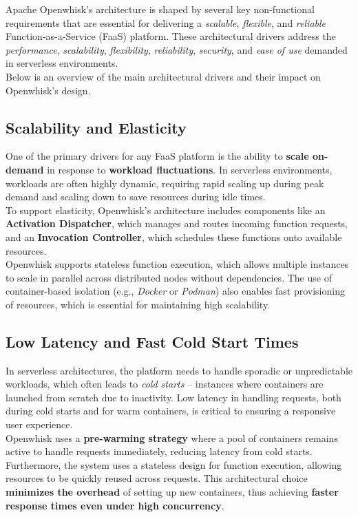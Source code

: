 Apache Openwhisk’s architecture is shaped by several key non-functional requirements that are essential for delivering a \textit{scalable}, \textit{flexible}, and \textit{reliable} Function-as-a-Service (FaaS) platform. These architectural drivers address the \textit{performance}, \textit{scalability}, \textit{flexibility}, \textit{reliability}, \textit{security}, and \textit{ease of use} demanded in serverless environments.\\
Below is an overview of the main architectural drivers and their impact on Openwhisk’s design.
\subsection{Scalability and Elasticity}
One of the primary drivers for any FaaS platform is the ability to \textbf{scale on-demand} in response to \textbf{workload fluctuations}. In serverless environments, workloads are often highly dynamic, requiring rapid scaling up during peak demand and scaling down to save resources during idle times.\vspace{14pt}\\
To support elasticity, Openwhisk’s architecture includes components like an \textbf{Activation Dispatcher}, which manages and routes incoming function requests, and an \textbf{Invocation Controller}, which schedules these functions onto available resources.\\
Openwhisk supports stateless function execution, which allows multiple instances to scale in parallel across distributed nodes without dependencies. The use of container-based isolation (e.g., \textit{Docker} or \textit{Podman}) also enables fast provisioning of resources, which is essential for maintaining high scalability.
\subsection{Low Latency and Fast Cold Start Times}
In serverless architectures, the platform needs to handle sporadic or unpredictable workloads, which often leads to \textit{cold starts} -- instances where containers are launched from scratch due to inactivity. Low latency in handling requests, both during cold starts and for warm containers, is critical to ensuring a responsive user experience.\vspace{14pt}\\
Openwhisk uses a \textbf{pre-warming strategy} where a pool of containers remains active to handle requests immediately, reducing latency from cold starts. Furthermore, the system uses a stateless design for function execution, allowing resources to be quickly reused across requests. This architectural choice \textbf{minimizes the overhead} of setting up new containers, thus achieving \textbf{faster response times even under high concurrency}.
